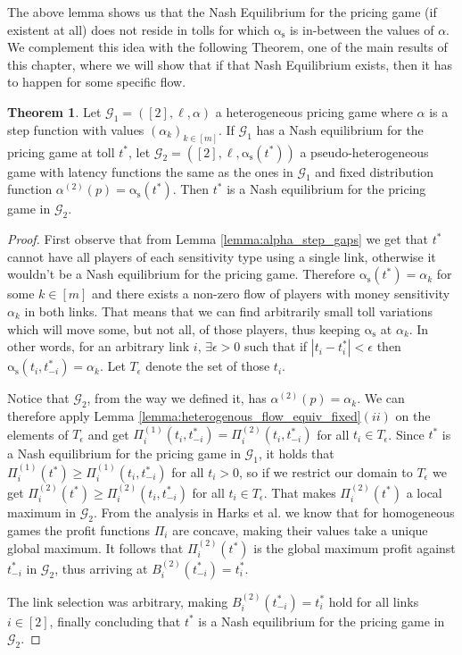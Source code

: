 \documentclass[10pt,a4paper]{book}
\newcommand{\as}{\mathrm{\alpha_s}}
\newcommand{\Gm}{\mathcal{G}}
\theoremstyle{definition}
\newtheorem{theorem}[definition]{Theorem}
\theoremstyle{comment}
\begin{document}
The above lemma shows us that the Nash Equilibrium for the pricing game (if existent at all) does not reside in tolls for which $\as$ is in-between the values of $\alpha$.
We complement this idea with the following Theorem, one of the main results of this chapter, where we will show that if that Nash Equilibrium exists, then it has to happen for some specific flow.

\begin{theorem}
	\label{theorem:a_step_ne_equiv_fixed}
	Let $\Gm_1 = ([2], \ell, \alpha)$ a heterogeneous pricing game where $\alpha$ is a step function with values $(\alpha_k)_{k \in [m]}$.
	If $\Gm_1$ has a Nash equilibrium for the pricing game at toll $t^*$, let $\Gm_2 = ([2], \ell, \as(t^*))$ a pseudo-heterogeneous game with latency functions the same as the ones in $\Gm_1$ and fixed distribution function $\alpha^{(2)}(p) = \as(t^*)$.
	Then $t^*$ is a Nash equilibrium for the pricing game in $\Gm_2$.
\end{theorem}

\begin{proof}
	First observe that from Lemma \ref{lemma:alpha_step_gaps} we get that $t^*$ cannot have all players of each sensitivity type using a single link, otherwise it wouldn't be a Nash equilibrium for the pricing game.
	Therefore $\as(t^*) = \alpha_k$ for some $k \in [m]$ and there exists a non-zero flow of players with money sensitivity $\alpha_k$ in both links.
	That means that we can find arbitrarily small toll variations which will move some, but not all, of those players, thus keeping $\as$ at $\alpha_k$.
	In other words, for an arbitrary link $i$, $\exists \epsilon > 0$ such that if $|t_i - t_i^*| < \epsilon$ then $\as(t_i, t_{-i}^*) = \alpha_k$.
	Let $T_\epsilon$ denote the set of those $t_i$.
	
	Notice that $\Gm_2$, from the way we defined it, has $\alpha^{(2)}(p) = \alpha_k$.
	We can therefore apply Lemma \ref{lemma:heterogenous_flow_equiv_fixed}$(ii)$ on the elements of $T_\epsilon$ and get $\Pi_i^{(1)}(t_i, t_{-i}^*) = \Pi_i^{(2)}(t_i, t_{-i}^*)$ for all $t_i \in T_\epsilon$.
	Since $t^*$ is a Nash equilibrium for the pricing game in $\Gm_1$, it holds that $\Pi_i^{(1)}(t^*) \ge \Pi_i^{(1)}(t_i, t_{-i}^*)$ for all $t_i > 0$, so if we restrict our domain to $T_\epsilon$ we get $\Pi_i^{(2)}(t^*) \ge \Pi_i^{(2)}(t_i, t_{-i}^*)$ for all $t_i \in T_\epsilon$.
	That makes $\Pi_i^{(2)}(t^*)$ a local maximum in $\Gm_2$.
	From the analysis in Harks et al. \cite{Harks_2019} we know that for homogeneous games the profit functions $\Pi_i$ are concave, making their values take a unique global maximum.
	It follows that $\Pi_i^{(2)}(t^*)$ is the global maximum profit against $t_{-i}^*$ in $\Gm_2$, thus arriving at $B_i^{(2)}(t_{-i}^*) = t_i^*$.
	
	The link selection was arbitrary, making $B_i^{(2)}(t_{-i}^*) = t_i^*$ hold for all links $i \in [2]$, finally concluding that $t^*$ is a Nash equilibrium for the pricing game in $\Gm_2$.
\end{proof}
\end{document}
